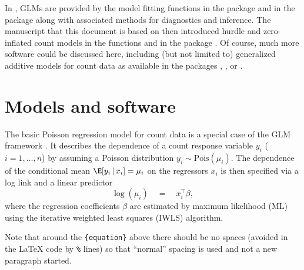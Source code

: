 \documentclass[article]{jss}
\newcommand{\fct}[1]{\code{#1()}}
\begin{document}
In  \citep{R}, GLMs are provided by the model fitting functions
\fct{glm} in the  package and \fct{glm.nb} in the  package
\citep[][Chapter~7.4]{Venables+Ripley:2002} along with associated methods for
diagnostics and inference. The manuscript that this document is based on
\citep{Zeileis+Kleiber+Jackman:2008} then introduced hurdle and zero-inflated
count models in the functions \fct{hurdle} and \fct{zeroinfl} in the 
package \citep{Jackman:2015}. Of course, much more software could be discussed
here, including (but not limited to) generalized additive models for count data
as available in the  packages  \citep{Wood:2006},
 \citep{Stasinopoulos+Rigby:2007}, or  \citep{Yee:2009}.




\section{Models and software} \label{sec:models}

The basic Poisson regression model for count data is a special case of the GLM
framework \cite{McCullagh+Nelder:1989}. It describes the dependence of a count
response variable $y_i$ ($i = 1, \dots, n$) by assuming a Poisson distribution
$y_i \sim \mathrm{Pois}(\mu_i)$. The dependence of the conditional mean
$\E[y_i \, | \, x_i] = \mu_i$ on the regressors $x_i$ is then specified via a
log link and a linear predictor
%
\begin{equation} \label{eq:mean}
\log(\mu_i) \quad = \quad x_i^\top \beta,
\end{equation}
%
where the regression coefficients $\beta$ are estimated by maximum likelihood
(ML) using the iterative weighted least squares (IWLS) algorithm.

\begin{leftbar}
Note that around the \verb|{equation}| above there should be no spaces (avoided
in the {\LaTeX} code by \verb|%| lines) so that ``normal'' spacing is used and
not a new paragraph started.
\end{leftbar}
\end{document}
